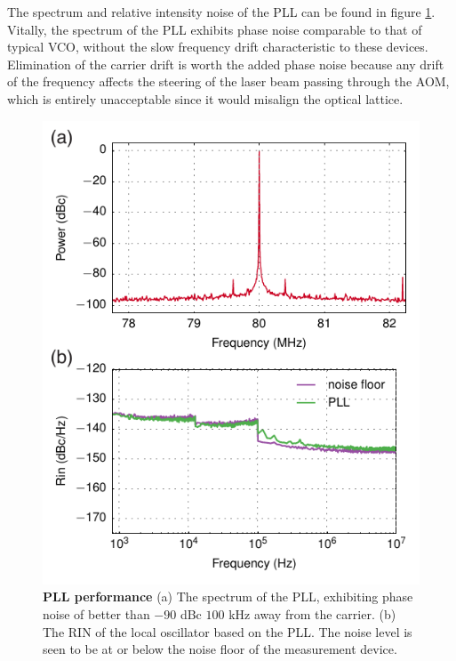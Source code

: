 \documentclass[twocolumn,aps,pra,showpacs,preprintnumbers,bibnotes]{revtex4-1}
\begin{document}
The spectrum and relative intensity noise of the PLL can be found in figure \ref{fig:pll}. 
Vitally, the spectrum of the PLL exhibits phase noise comparable to that of typical VCO, without the slow frequency drift characteristic to these devices. 
Elimination of the carrier drift is worth the added phase noise because any drift of the frequency affects the steering of the laser beam passing through the AOM, which is entirely unacceptable since it would misalign the optical lattice.

\begin{figure}
  \begin{center}
    \includegraphics{fig/pll.pdf}
    \caption{\textbf{PLL performance} (a) The spectrum of the PLL, exhibiting phase noise of better than $-90$ dBc $100$ kHz away from the carrier. (b) The RIN of the local oscillator based on the PLL. The noise level is seen to be at or below the noise floor of the measurement device.}\label{fig:pll}
  \end{center}
\end{figure}
\end{document}
